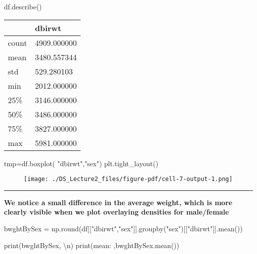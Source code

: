 \documentclass[
  letterpaper,
  DIV=11,
  numbers=noendperiod]{scrreprt}
\newenvironment{Shaded}{\begin{snugshade}}{\end{snugshade}}
\newcommand{\BuiltInTok}[1]{\textcolor[rgb]{0.00,0.23,0.31}{#1}}
\newcommand{\CharTok}[1]{\textcolor[rgb]{0.13,0.47,0.30}{#1}}
\newcommand{\NormalTok}[1]{\textcolor[rgb]{0.00,0.23,0.31}{#1}}
\newcommand{\OperatorTok}[1]{\textcolor[rgb]{0.37,0.37,0.37}{#1}}
\newcommand{\StringTok}[1]{\textcolor[rgb]{0.13,0.47,0.30}{#1}}
\begin{document}
\begin{Shaded}
\begin{Highlighting}[]
\NormalTok{df.describe()}
\end{Highlighting}
\end{Shaded}

\begin{longtable}[]{@{}ll@{}}
\toprule()
& dbirwt \\
\midrule()
\endhead
count & 4909.000000 \\
mean & 3480.557344 \\
std & 529.280103 \\
min & 2012.000000 \\
25\% & 3146.000000 \\
50\% & 3486.000000 \\
75\% & 3827.000000 \\
max & 5981.000000 \\
\bottomrule()
\end{longtable}

\begin{Shaded}
\begin{Highlighting}[]
\NormalTok{tmp}\OperatorTok{=}\NormalTok{df.boxplot( }\StringTok{"dbirwt"}\NormalTok{,}\StringTok{"sex"}\NormalTok{)}
\NormalTok{plt.tight\_layout()}
\end{Highlighting}
\end{Shaded}

\begin{figure}[H]

{\centering \texttt{[image: ./DS\_Lecture2\_files/figure-pdf/cell-7-output-1.png]}

}

\end{figure}

\begin{center}\rule{0.5\linewidth}{0.5pt}\end{center}

\textbf{We notice a small difference in the average weight, which is
more clearly visible when we plot overlaying densities for male/female}

\begin{Shaded}
\begin{Highlighting}[]
\NormalTok{bwghtBySex }\OperatorTok{=}\NormalTok{ np.}\BuiltInTok{round}\NormalTok{(df[[}\StringTok{"dbirwt"}\NormalTok{,}\StringTok{"sex"}\NormalTok{]].groupby(}\StringTok{"sex"}\NormalTok{)[[}\StringTok{"dbirwt"}\NormalTok{]].mean())}

\BuiltInTok{print}\NormalTok{(bwghtBySex, }\StringTok{\textquotesingle{}}\CharTok{\textbackslash{}n}\StringTok{\textquotesingle{}}\NormalTok{)}
\BuiltInTok{print}\NormalTok{(}\StringTok{\textquotesingle{}mean: \textquotesingle{}}\NormalTok{,bwghtBySex.mean())}
\end{Highlighting}
\end{Shaded}
\end{document}
